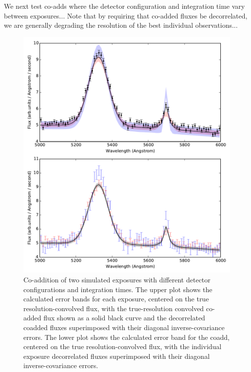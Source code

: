 \documentclass[12pt]{article}
\begin{document}
We next test co-adds where the detector configuration and integration time vary between exposures... Note that by requiring that co-added fluxes be decorrelated, we are generally degrading the resolution of the best individual observations...

\begin{figure}[htb]
\begin{center}
\includegraphics[width=5in]{fig/stacked}
\caption{Co-addition of two simulated exposures with different detector configurations and integration times. The upper plot shows the calculated error bands for each exposure, centered on the true resolution-convolved flux, with the true-resolution convolved co-added flux shown as a solid black curve and the decorrelated coadded fluxes superimposed with their diagonal inverse-covariance errors. The lower plot shows the calculated error band for the coadd, centered on the true resolution-convolved flux, with the individual exposure decorrelated fluxes superimposed with their diagonal inverse-covariance errors.}
\label{fig:stacked}
\end{center}
\end{figure}
\end{document}
